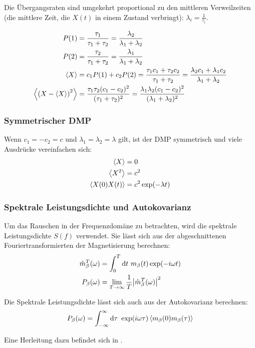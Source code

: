 \documentclass[main.tex]{subfiles}
\begin{document}
Die Übergangsraten sind umgekehrt proportional zu den mittleren Verweilzeiten
(die mittlere Zeit, die \(X(t)\) in einem Zustand verbringt): \(\lambda_i =
\frac{1}{\tau_i}\).

\begin{align}
	P(1)                            & = \frac{\tau_1}{\tau_1 + \tau_2} =
	\frac{\lambda_2 }{\lambda_1 +
		\lambda_2}
	\\
	P(2)                            & = \frac{\tau_2}{\tau_1 + \tau_2} =
	\frac{\lambda_1 }{\lambda_1 +
		\lambda_2}
	\\
	\expval{X}                      & = c_1 P(1) + c_2 P(2) = \frac{\tau_1
		c_1 + \tau_2
		c_2}{\tau_1 + \tau_2} = \frac{\lambda_2 c_1 + \lambda_1
		c_2}{\lambda_1 +
		\lambda_2}
	\\
	\expval{\qty(X - \expval{X})^2} & = \frac{\tau_1 \tau_2
		(c_1-c_2)^2}{(\tau_1 + \tau_2)^2} = \frac{\lambda_1 \lambda_2
		(c_1-c_2)^2}{(\lambda_1 + \lambda_2)^2}
\end{align}


\subsubsection*{Symmetrischer DMP}

Wenn \(c_1=-c_2=c\) und \(\lambda_1 = \lambda_2 = \lambda\) gilt, ist der DMP
symmetrisch und viele Ausdrücke vereinfachen sich:
\begin{align}
	\expval{X}        & = 0                    \\
	\expval{X^2}      & = c^2                  \\
	\expval{X(0)X(t)} & = c^2 \exp(-\lambda t)
\end{align}\cite{matphys}

\subsubsection*{Spektrale Leistungsdichte und Autokovarianz}

Um das Rauschen in der Frequenzdomäne zu betrachten, wird die spektrale
Leistungsdichte \(S(f)\) verwendet. Sie lässt sich aus der abgeschnittenen
Fouriertransformierten der Magnetisierung berechnen:
\begin{align}
	\hat{m}_\beta^T(\omega) & = \int_0^T \mathrm{d} t \ m_\beta(t) \exp(-i \omega
	t)
	\\
	P_{\beta}(\omega)       & = \lim_{T \to \infty} \frac{1}{T}
	\abs{\hat{m}_\beta^T(\omega)}^2
\end{align}

Die Spektrale Leistungsdichte lässt sich auch aus der Autokovarianz berechnen:
\begin{align}
	P_\beta(\omega) = \int_{-\infty}^{\infty} \mathrm{d} \tau \ \exp(i \omega
	\tau) \expval{m_\beta(0) m_\beta(\tau)}
\end{align}

Eine Herleitung dazu befindet sich in \cite{schlegel-master}.

\end{document}
